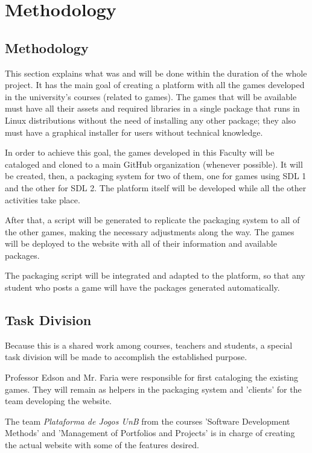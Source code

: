 \chapter[Methodology]{Methodology}
\section[Methodology]{Methodology}

This section explains what was and will be done within the duration of the whole project. It has the main goal of creating a platform with all the games developed in the university's courses (related to games). The games that will be available must have all their assets and required libraries in a single package that runs in Linux distributions without the need of installing any other package; they also must have a graphical installer for users without technical knowledge.

In order to achieve this goal, the games developed in this Faculty will be cataloged and cloned to a main GitHub organization (whenever possible). It will be created, then, a packaging system for two of them, one for games using SDL 1 and the other for SDL 2. The platform itself will be developed while all the other activities take place.

After that, a script will be generated to replicate the packaging system to all of the other games, making the necessary adjustments along the way. The games will be deployed to the website with all of their information and available packages.

The packaging script will be integrated and adapted to the platform, so that any student who posts a game will have the packages generated automatically.

\section[Task Division]{Task Division}

Because this is a shared work among courses, teachers and students, a special task division will be made to accomplish the established purpose.

Professor Edson and Mr. Faria were responsible for first cataloging the existing games. They will remain as helpers in the packaging system and 'clients' for the team developing the website.

The team \textit{Plataforma de Jogos UnB} from the courses 'Software Development Methods' and 'Management of Portfolios and Projects' is in charge of creating the actual website with some of the features desired.

